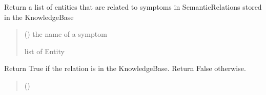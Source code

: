 \documentclass[letterpaper,10pt,english]{sphinxmanual}
\begin{document}
\begin{fulllineitems}
\begin{fulllineitems}
\begin{quote}
\begin{description}
\end{description}\end{quote}

\end{fulllineitems}


\begin{fulllineitems}
\label{\detokenize{medextractor.knowledge:medextractor.knowledge.base.KnowledgeBase.get_entities}}
\pysigstartsignatures
{}
\pysigstopsignatures
\sphinxAtStartPar
Return a list of entities that are related to symptoms in SemanticRelations stored in the KnowledgeBase
\begin{quote}\begin{description}
\sphinxAtStartPar
{} () \textendash{} the name of a symptom

\sphinxAtStartPar
list of Entity

\end{description}\end{quote}

\end{fulllineitems}


\begin{fulllineitems}
\label{\detokenize{medextractor.knowledge:medextractor.knowledge.base.KnowledgeBase.has_relation}}
\pysigstartsignatures
{}
\pysigstopsignatures
\sphinxAtStartPar
Return True if the relation is in the KnowledgeBase. Return False otherwise.
\begin{quote}\begin{description}
\sphinxAtStartPar
{} ({\hyperref[\detokenize{medextractor.knowledge:medextractor.knowledge.semantics.SemanticRelation}]{}}) \textendash{} 


\end{description}
\end{quote}
\end{fulllineitems}
\end{fulllineitems}
\end{document}
